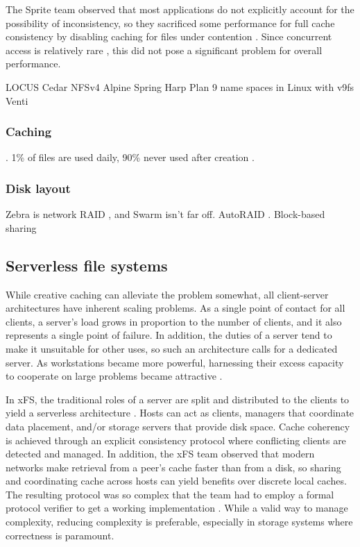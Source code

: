 The Sprite team observed that most applications do not explicitly account for the possibility of inconsistency, so they sacrificed some performance for full cache consistency by disabling caching for files under contention \cite{baker91,nelson,welch}. Since concurrent access is relatively rare \cite{kistler}, this did not pose a significant problem for overall performance.

LOCUS \cite{walker}
Cedar \cite{gifford,hagmann}
NFSv4
Alpine \cite{brown}
Spring \cite{khalidi}
Harp \cite{liskov}
Plan 9 \cite{pike90} name spaces \cite{pike92} in Linux with v9fs \cite{hensbergen}
Venti \cite{quinlan}

\subsubsection{Caching}
\cite{dahlin94a}\cite{chaiken}\cite{blaze}\cite{dahlin94b}\cite{keleher}\cite{muthitacharoen}. 1\% of files are used daily, 90\% never used after creation \cite{gibson98b}.

\subsubsection{Disk layout}
Zebra \cite{hartman93} is network RAID \cite{patterson}, and Swarm \cite{hartman99} isn't far off. AutoRAID \cite{wilkes95}. Block-based sharing \cite{mcgregor}

\subsection{Serverless file systems}

While creative caching can alleviate the problem somewhat, all client-server architectures have inherent scaling problems. As a single point of contact for all clients, a server's load grows in proportion to the number of clients, and it also represents a single point of failure. In addition, the duties of a server tend to make it unsuitable for other uses, so such an architecture calls for a dedicated server. As workstations became more powerful, harnessing their excess capacity to cooperate on large problems became attractive \cite{anderson95a}.

In xFS, the traditional roles of a server are split and distributed to the clients to yield a serverless architecture \cite{wang93,anderson95b}. Hosts can act as clients, managers that coordinate data placement, and/or storage servers that provide disk space. Cache coherency is achieved through an explicit consistency protocol where conflicting clients are detected and managed. In addition, the xFS team observed that modern networks make retrieval from a peer's cache faster than from a disk, so sharing and coordinating cache across hosts can yield benefits over discrete local caches. The resulting protocol was so complex that the team had to employ a formal protocol verifier to get a working implementation \cite{wang98}. While a valid way to manage complexity, reducing complexity is preferable, especially in storage systems where correctness is paramount.

